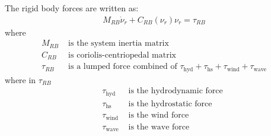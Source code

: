 The rigid body forces are written as:
\begin{align}
M_{RB} \dot \nu_r + C_{RB}(\nu_r)\nu_r = \tau_{RB}
\label{eq:rigidmodel}
\end{align}
where
\begin{align}
M_{RB} &\text{ is the system inertia matrix}\nonumber\\
C_{RB} &\text{ is coriolis-centriopedal matrix}\nonumber\\
\tau_{RB} &\text{ is a lumped force combined of } \tau_{\text{hyd}} + \tau_{\text{hs}} + \tau_{\text{wind}} + \tau_{\text{wave}}\nonumber
\end{align}
where in $\tau_{RB}$
\begin{align}
\qquad \tau_{\text{hyd}} &\text{ is the hydrodynamic force}\nonumber\\
\qquad \tau_{\text{hs}} &\text{ is the hydrostatic force}\nonumber\\
\qquad \tau_{\text{wind}} &\text{ is the wind force}\nonumber\\
\qquad \tau_{\text{wave}} &\text{ is the wave force}\nonumber
\end{align}


